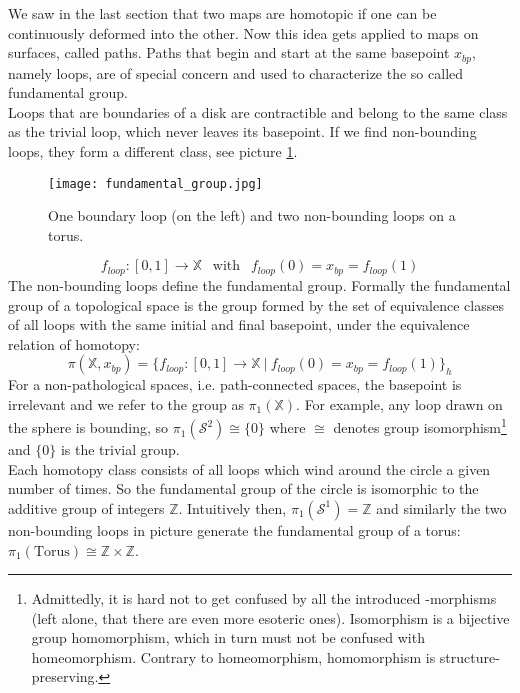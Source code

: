 We saw in the last section that two maps are homotopic if one can be continuously deformed into the other.
Now this idea gets applied to maps on surfaces, called paths.
Paths that begin and start at the same basepoint $x_{bp}$, namely loops, are of special concern and used to characterize the so called fundamental group.\\
Loops that are boundaries of a disk are contractible and belong to the same class as the trivial loop, which never leaves its basepoint.
If we find non-bounding loops, they form a different class, see picture \ref{fig:fundamental_group_torus}.
\begin{figure}[htb]
\centering
\texttt{[image: fundamental\_group.jpg]}
\caption{One boundary loop (on the left) and two non-bounding loops on a torus.}
\label{fig:fundamental_group_torus}
\end{figure}
\begin{equation}
	f_{loop}: [0,1] \rightarrow \mathbb{X} ~~ \text{ with }~~ f_{loop}(0) = x_{bp} = f_{loop}(1)
\end{equation}
The non-bounding loops define the fundamental group.
Formally the fundamental group of a topological space is the group formed by the set of equivalence classes of all loops with the same initial and final basepoint, under the equivalence relation of homotopy:
\begin{equation}
	\pi(\mathbb{X}, x_{bp}) = \{ f_{loop}: [0,1] \rightarrow \mathbb{X} ~|~ f_{loop}(0) = x_{bp} = f_{loop}(1)\}_{h}
\end{equation}
For a non-pathological spaces, i.e. path-connected spaces, the basepoint is irrelevant and we refer to the group as $\pi_{1}(\mathbb{X})$.
For example, any loop drawn on the sphere is bounding, so $\pi_{1}(\mathcal{S}^{2}) \cong \{0\}$ where $\cong$ denotes group isomorphism\footnote{ Admittedly, it is hard not to get confused by all the introduced -morphisms (left alone, that there are even more esoteric ones). Isomorphism is a bijective group homomorphism, which in turn must not be confused with homeomorphism. Contrary to homeomorphism, homomorphism is structure-preserving.} and $\{0\}$ is the trivial group.\\
Each homotopy class consists of all loops which wind around the circle a given number of times.
So the fundamental group of the circle is isomorphic to the additive group of integers $\mathbb{Z}$.
Intuitively then, $\pi_{1}(\mathcal{S}^{1}) = \mathbb{Z}$ and similarly the two non-bounding loops in picture \label{fig:fundamental_group} generate the fundamental group of a torus: $\pi_{1}(\text{Torus}) \cong \mathbb{Z} \times \mathbb{Z}$.\\
